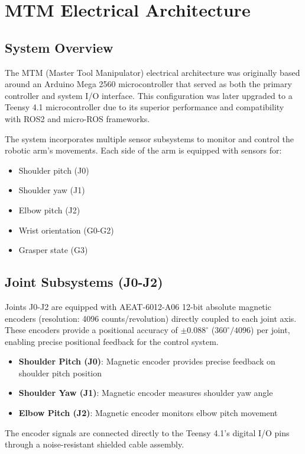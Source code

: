 \section{MTM Electrical Architecture}

\subsection{System Overview}
The MTM (Master Tool Manipulator) electrical architecture was originally based around an Arduino Mega 2560 microcontroller that served as both the primary controller and system I/O interface. This configuration was later upgraded to a Teensy 4.1 microcontroller due to its superior performance and compatibility with ROS2 and micro-ROS frameworks.

The system incorporates multiple sensor subsystems to monitor and control the robotic arm's movements. Each side of the arm is equipped with sensors for:
\begin{itemize}
    \item Shoulder pitch (J0)
    \item Shoulder yaw (J1)
    \item Elbow pitch (J2)
    \item Wrist orientation (G0-G2)
    \item Grasper state (G3)
\end{itemize}

\subsection{Joint Subsystems (J0-J2)}
Joints J0-J2 are equipped with AEAT-6012-A06 12-bit absolute magnetic encoders (resolution: 4096 counts/revolution) directly coupled to each joint axis. These encoders provide a positional accuracy of $\pm 0.088^\circ$ ($360^\circ/4096$) per joint, enabling precise positional feedback for the control system.

\begin{itemize}
    \item \textbf{Shoulder Pitch (J0)}: Magnetic encoder provides precise feedback on shoulder pitch position
    \item \textbf{Shoulder Yaw (J1)}: Magnetic encoder measures shoulder yaw angle
    \item \textbf{Elbow Pitch (J2)}: Magnetic encoder monitors elbow pitch movement
\end{itemize}

The encoder signals are connected directly to the Teensy 4.1's digital I/O pins through a noise-resistant shielded cable assembly.

